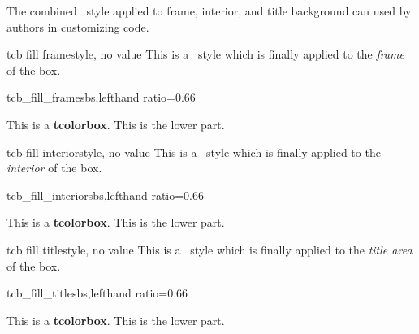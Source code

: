 \clearpage

The combined \tikzname\ style applied to frame, interior, and title
background can used by authors in customizing code.

\begin{docTikzKey}{tcb fill frame}{}{style, no value}
This is a \tikzname\ style which is finally applied to the \emph{frame}
of the box.

\begin{exdispExample*}{tcb_fill_frame}{sbs,lefthand ratio=0.66}

\begin{tcolorbox}[title=My title]
This is a \textbf{tcolorbox}.
\tcblower
This is the lower part.
\end{tcolorbox}
\end{exdispExample*}
\end{docTikzKey}


\begin{docTikzKey}{tcb fill interior}{}{style, no value}
This is a \tikzname\ style which is finally applied to the \emph{interior}
of the box.

\begin{exdispExample*}{tcb_fill_interior}{sbs,lefthand ratio=0.66}

\begin{tcolorbox}[title=My title]
This is a \textbf{tcolorbox}.
\tcblower
This is the lower part.
\end{tcolorbox}
\end{exdispExample*}
\end{docTikzKey}


\begin{docTikzKey}{tcb fill title}{}{style, no value}
This is a \tikzname\ style which is finally applied to the \emph{title area}
of the box.

\begin{exdispExample*}{tcb_fill_title}{sbs,lefthand ratio=0.66}

\begin{tcolorbox}[title=My title]
This is a \textbf{tcolorbox}.
\tcblower
This is the lower part.
\end{tcolorbox}
\end{exdispExample*}
\end{docTikzKey}


